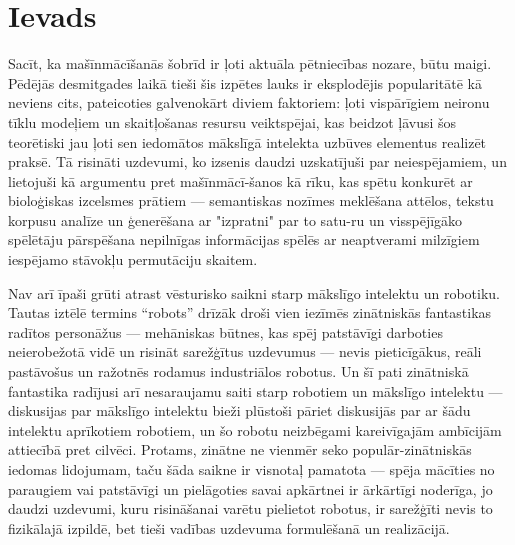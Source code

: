 \documentclass[12pt, a4paper]{article}
\numberwithin{equation}{section} %
\begin{document}

\newpage
\tableofcontents
\thispagestyle{empty}
\newpage
\setcounter{page}{3}


\section{Ievads}

Sacīt, ka mašīnmācīšanās šobrīd ir ļoti aktuāla pētniecības nozare, būtu maigi. Pēdējās desmitgades laikā tieši šis izpētes lauks ir eksplodējis popularitātē kā neviens cits, pateicoties galvenokārt diviem faktoriem: ļoti vispārīgiem neironu tīklu modeļiem un skaitļošanas resursu veiktspējai, kas beidzot ļāvusi šos teorētiski jau ļoti sen\cite{mcculloch1943logical, linnainmaa1970representation, fukushima1988neocognitron} iedomātos mākslīgā intelekta uzbūves elementus realizēt praksē. Tā risināti uzdevumi, ko izsenis daudzi uzskatījuši par neiespējamiem, un lietojuši kā argumentu pret mašīnmācī-šanos kā rīku, kas spētu konkurēt ar bioloģiskas izcelsmes prātiem --- semantiskas nozīmes meklēšana attēlos\cite{krizhevsky2012imagenet}, tekstu korpusu analīze un ģenerēšana ar "izpratni" par to satu-ru\cite{vaswani2017attention} un visspējīgāko spēlētāju pārspēšana nepilnīgas informācijas spēlēs ar neaptverami milzīgiem iespējamo stāvokļu permutāciju skaitem\cite{silver2016mastering}.

Nav arī īpaši grūti atrast vēsturisko saikni starp mākslīgo intelektu un robotiku. Tautas iztēlē termins ``robots'' drīzāk droši vien iezīmēs zinātniskās fantastikas radītos personāžus --- mehāniskas būtnes, kas spēj patstāvīgi darboties neierobežotā vidē un risināt sarežģītus uzdevumus --- nevis pieticīgākus, reāli pastāvošus un ražotnēs rodamus industriālos robotus. Un šī pati zinātniskā fantastika radījusi arī nesaraujamu saiti starp robotiem un mākslīgo intelektu\cite{asimov2004robot} --- diskusijas par mākslīgo intelektu bieži plūstoši pāriet diskusijās par ar šādu intelektu aprīkotiem robotiem, un šo robotu neizbēgami kareivīgajām ambīcijām attiecībā pret cilvēci. Protams, zinātne ne vienmēr seko populār-zinātniskās iedomas lidojumam, taču šāda saikne ir visnotaļ pamatota --- spēja mācīties no paraugiem vai patstāvīgi un pielāgoties savai apkārtnei ir ārkārtīgi noderīga, jo daudzi uzdevumi, kuru risināšanai varētu pielietot robotus, ir sarežģīti nevis to fizikālajā izpildē, bet tieši vadības uzdevuma formulēšanā un realizācijā.
\end{document}
